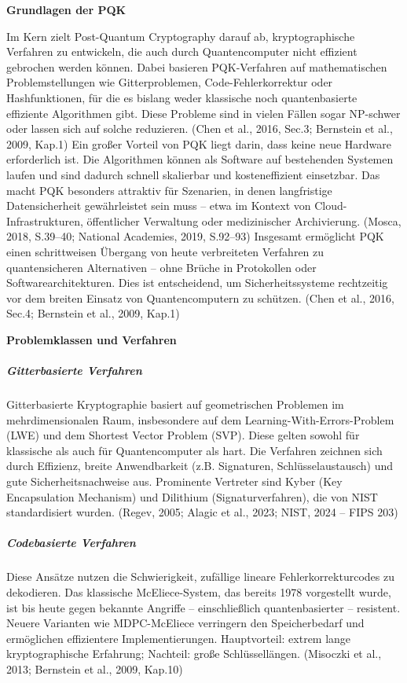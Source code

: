 \vspace{1em}
\noindent\textbf{Grundlagen der PQK}

\noindent
Im Kern zielt Post-Quantum Cryptography darauf ab, kryptographische Verfahren zu entwickeln, die auch durch Quantencomputer nicht effizient gebrochen werden können. Dabei basieren PQK-Verfahren auf mathematischen Problemstellungen wie Gitterproblemen, Code-Fehlerkorrektur oder Hashfunktionen, für die es bislang weder klassische noch quantenbasierte effiziente Algorithmen gibt. Diese Probleme sind in vielen Fällen sogar NP-schwer oder lassen sich auf solche reduzieren.
 (Chen et al., 2016, Sec.3; Bernstein et al., 2009, Kap.1)
Ein großer Vorteil von PQK liegt darin, dass keine neue Hardware erforderlich ist. Die Algorithmen können als Software auf bestehenden Systemen laufen und sind dadurch schnell skalierbar und kosteneffizient einsetzbar. Das macht PQK besonders attraktiv für Szenarien, in denen langfristige Datensicherheit gewährleistet sein muss – etwa im Kontext von Cloud-Infrastrukturen, öffentlicher Verwaltung oder medizinischer Archivierung.
 (Mosca, 2018, S.39–40; National Academies, 2019, S.92–93)
Insgesamt ermöglicht PQK einen schrittweisen Übergang von heute verbreiteten Verfahren zu quantensicheren Alternativen – ohne Brüche in Protokollen oder Softwarearchitekturen. Dies ist entscheidend, um Sicherheitssysteme rechtzeitig vor dem breiten Einsatz von Quantencomputern zu schützen.
 (Chen et al., 2016, Sec.4; Bernstein et al., 2009, Kap.1)

\vspace{1em}
\noindent\textbf{Problemklassen und Verfahren}
\subparagraph{Gitterbasierte Verfahren}
Gitterbasierte Kryptographie basiert auf geometrischen Problemen im mehrdimensionalen Raum, insbesondere auf dem Learning-With-Errors-Problem (LWE) und dem Shortest Vector Problem (SVP). Diese gelten sowohl für klassische als auch für Quantencomputer als hart. Die Verfahren zeichnen sich durch Effizienz, breite Anwendbarkeit (z.B. Signaturen, Schlüsselaustausch) und gute Sicherheitsnachweise aus. Prominente Vertreter sind Kyber (Key Encapsulation Mechanism) und Dilithium (Signaturverfahren), die von NIST standardisiert wurden.
 (Regev, 2005; Alagic et al., 2023; NIST, 2024 – FIPS 203)
 
\subparagraph{Codebasierte Verfahren}
Diese Ansätze nutzen die Schwierigkeit, zufällige lineare Fehlerkorrekturcodes zu dekodieren. Das klassische McEliece-System, das bereits 1978 vorgestellt wurde, ist bis heute gegen bekannte Angriffe – einschließlich quantenbasierter – resistent. Neuere Varianten wie MDPC-McEliece verringern den Speicherbedarf und ermöglichen effizientere Implementierungen. Hauptvorteil: extrem lange kryptographische Erfahrung; Nachteil: große Schlüssellängen.
 (Misoczki et al., 2013; Bernstein et al., 2009, Kap.10)
 
